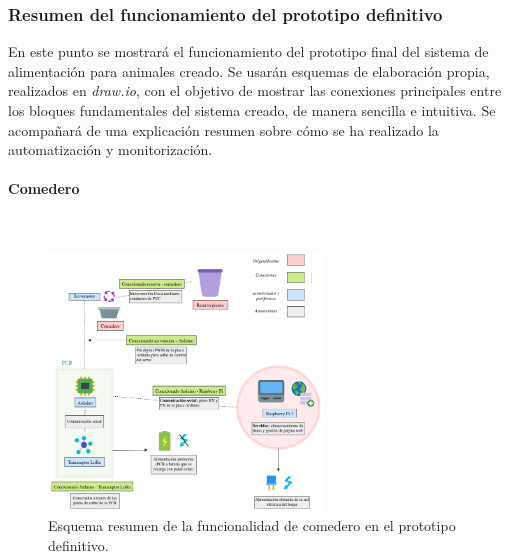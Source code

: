 \documentclass[12pt]{article}
\newcommand{\subsubsubsection}[1]{\paragraph{#1}\mbox{}\\}
\begin{document}
	\subsubsection{Resumen del funcionamiento del prototipo definitivo}
	
	\noindent En este punto se mostrará el funcionamiento del prototipo final del sistema de alimentación para animales creado. Se usarán esquemas de elaboración propia, realizados en \textit{draw.io}, con el objetivo de mostrar las conexiones principales entre los bloques fundamentales del sistema creado, de manera sencilla e intuitiva. Se acompañará de una explicación resumen  sobre cómo se ha realizado la automatización y monitorización.
		
	\subsubsubsection{Comedero}

	\begin{figure}[h!]
		\begin{center}
			\includegraphics[width=0.65\textwidth]{img/conexiones tfg-comedero.png}
			\caption{Esquema resumen de la funcionalidad de comedero en el prototipo definitivo.}
			\label{Conexiones TFG comedero.}
		\end{center}
	\end{figure}
	
\end{document}
